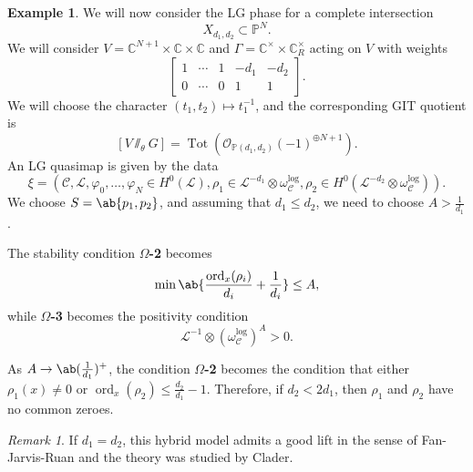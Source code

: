 \documentclass[10pt]{amsart}
\theoremstyle{definition}
\newtheorem{exm}[thm]{Example}
\theoremstyle{remark}
\newtheorem{rmk}[thm]{Remark}
\theoremstyle{plain}
\theoremstyle{definition}
\theoremstyle{remark}
\newcommand{\C}{\mathbb{C}}
\renewcommand{\P}{\mathbb{P}}
\newcommand{\mc}[1]{\mathcal{#1}}
\newcommand{\on}[1]{\operatorname{#1}}
\newcommand{\1}{\mathbf{1}}
\newcommand{\2}{\mathbf{2}}
\newcommand{\3}{\mathbf{3}}
\begin{document}
\begin{exm}
    We will now consider the LG phase for a complete intersection
    \[ X_{d_1, d_2} \subset \P^N. \]
    We will consider $V = \C^{N+1} \times \C \times \C$ and $\Gamma = \C^{\times} \times \C^{\times}_R$ acting on $V$ with weights
    \[ \begin{bmatrix}
        1 & \cdots & 1 & -d_1 & -d_2 \\
        0 & \cdots & 0 & 1 & 1
    \end{bmatrix}. \]
    We will choose the character $(t_1, t_2) \mapsto t_1^{-1}$, and the corresponding GIT quotient is 
    \[ [V \sslash_{\theta} G] = \on{Tot}(\mc{O}_{\P(d_1, d_2)}(-1)^{\oplus N+1}). \] 
    An LG quasimap is given by the data
    \[ \xi = (\mc{C}, \mc{L}, \varphi_0, \ldots, \varphi_N \in H^0(\mc{L}), \rho_1 \in \mc{L}^{-d_1} \otimes \omega_{\mc{C}}^{\log}, \rho_2 \in H^0(\mc{L}^{-d_2} \otimes \omega_{\mc{C}}^{\log})). \]
    We choose $S = \ab\{p_1, p_2 \}$, and assuming that $d_1 \leq d_2$, we need to choose $A > \frac{1}{d_1}$.

    The stability condition \textbf{$\Omega$-2} becomes
    \[ \min \ab\{ \frac{\on{ord}_x(\rho_i)}{d_i} + \frac{1}{d_i}\} \leq A, \]
    while \textbf{$\Omega$-3} becomes the positivity condition
    \[ \mc{L}^{-1} \otimes (\omega_{\mc{C}}^{\log})^A > 0. \]

    As $A \to \ab(\frac{1}{d_1})^+$, the condition \textbf{$\Omega$-2} becomes the condition that either $\rho_1(x) \neq 0$ or $\on{ord}_x(\rho_2) \leq \frac{d_2}{d_1} - 1$. Therefore, if $d_2 < 2 d_1$, then $\rho_1$ and $\rho_2$ have no common zeroes.
\end{exm}

\begin{rmk}
    If $d_1 = d_2$, this hybrid model admits a good lift in the sense of Fan-Jarvis-Ruan and the theory was studied by Clader.
\end{rmk}
\end{document}
